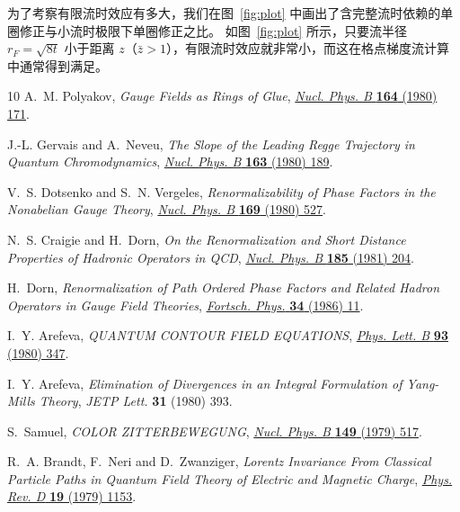 为了考察有限流时效应有多大，我们在图~\ref{fig:plot} 中画出了含完整流时依赖的单圈修正与小流时极限下单圈修正之比。
如图~\ref{fig:plot} 所示，只要流半径 $r_F = \sqrt{8t}$ 小于距离 $z$（$\bar{z}>1$），有限流时效应就非常小，而这在格点梯度流计算中通常得到满足。
\begingroup\raggedright
\begin{thebibliography}{10}
A.~M. Polyakov, \emph{{Gauge Fields as Rings of Glue}},
  \href{https://doi.org/10.1016/0550-3213(80)90507-6}{\emph{Nucl. Phys. B}
  {\bfseries 164} (1980) 171}.

J.-L. Gervais and A.~Neveu, \emph{{The Slope of the Leading Regge Trajectory in
  Quantum Chromodynamics}},
  \href{https://doi.org/10.1016/0550-3213(80)90397-1}{\emph{Nucl. Phys. B}
  {\bfseries 163} (1980) 189}.

V.~S. Dotsenko and S.~N. Vergeles, \emph{{Renormalizability of Phase Factors in
  the Nonabelian Gauge Theory}},
  \href{https://doi.org/10.1016/0550-3213(80)90103-0}{\emph{Nucl. Phys. B}
  {\bfseries 169} (1980) 527}.

N.~S. Craigie and H.~Dorn, \emph{{On the Renormalization and Short Distance
  Properties of Hadronic Operators in {QCD}}},
  \href{https://doi.org/10.1016/0550-3213(81)90372-2}{\emph{Nucl. Phys. B}
  {\bfseries 185} (1981) 204}.

H.~Dorn, \emph{{Renormalization of Path Ordered Phase Factors and Related
  Hadron Operators in Gauge Field Theories}},
  \href{https://doi.org/10.1002/prop.19860340104}{\emph{Fortsch. Phys.}
  {\bfseries 34} (1986) 11}.

I.~Y. Arefeva, \emph{{QUANTUM CONTOUR FIELD EQUATIONS}},
  \href{https://doi.org/10.1016/0370-2693(80)90529-8}{\emph{Phys. Lett. B}
  {\bfseries 93} (1980) 347}.

I.~Y. Arefeva, \emph{{Elimination of Divergences in an Integral Formulation of
  {Yang-Mills} Theory}}, {\emph{JETP Lett.} {\bfseries 31} (1980) 393}.

S.~Samuel, \emph{{COLOR ZITTERBEWEGUNG}},
  \href{https://doi.org/10.1016/0550-3213(79)90005-1}{\emph{Nucl. Phys. B}
  {\bfseries 149} (1979) 517}.

R.~A. Brandt, F.~Neri and D.~Zwanziger, \emph{{Lorentz Invariance From
  Classical Particle Paths in Quantum Field Theory of Electric and Magnetic
  Charge}}, \href{https://doi.org/10.1103/PhysRevD.19.1153}{\emph{Phys. Rev. D}
  {\bfseries 19} (1979) 1153}.


\end{thebibliography}
